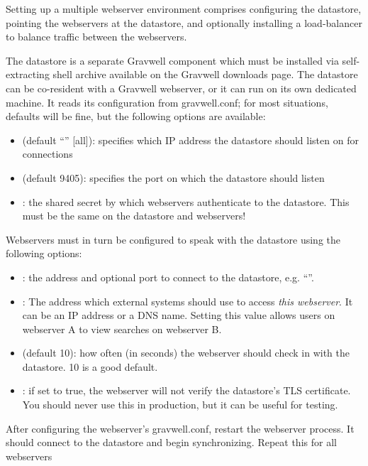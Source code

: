 Setting up a multiple webserver environment comprises configuring the
datastore, pointing the webservers at the datastore, and optionally
installing a load-balancer to balance traffic between the webservers.

The datastore is a separate Gravwell component which must be installed
via self-extracting shell archive available on the Gravwell downloads
page. The datastore can be co-resident with a Gravwell webserver, or it
can run on its own dedicated machine. It reads its configuration from
gravwell.conf; for most situations, defaults will be fine, but the following
options are available:

\begin{itemize}
\item
   (default ``'' [all]): specifies which
  IP address the datastore should listen on for connections
\item
   (default 9405): specifies the port on which the
  datastore should listen
\item
  : the shared secret by which webservers authenticate to
  the datastore. This must be the same on the datastore and webservers!
\end{itemize}

Webservers must in turn be configured to speak with the datastore using
the following options:

\begin{itemize}
\item
  : the address and optional port to connect to the
  datastore, e.g. ``''.
\item
  : The address which external systems should use to
  access \emph{this webserver}. It can be an IP address or a DNS name.
  Setting this value allows users on webserver A to view searches on
  webserver B.
\item
   (default 10): how often (in seconds) the
  webserver should check in with the datastore. 10 is a good default.
\item
  : if set to true, the webserver will not verify the datastore's TLS certificate. You should never use this in production, but it can be useful for testing.
\end{itemize}

After configuring the webserver's gravwell.conf, restart the webserver
process. It should connect to the datastore and begin synchronizing.
Repeat this for all webservers

